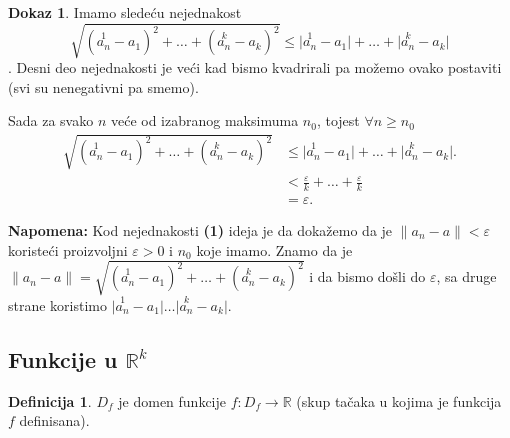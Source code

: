 \documentclass[11pt]{article}
\theoremstyle{definition}
\newtheorem{definicija}{Definicija}[section]
\theoremstyle{serbnodot}
\newtheorem*{dokaz}{Dokaz}
\newcommand{\napomena}[1]{%
    \textbf{Napomena:} #1
}
\begin{document}
\begin{dokaz}
    \vspace{1em}
    Imamo sledeću nejednakost
    \[
        \sqrt{(\overset{1}{a_n} - a_1)^2 + \dots +
        (\overset{k}{a_n} - a_k)^2}
        \leq
        \lvert \overset{1}{a_n} - a_1 \rvert + \dots +
        \lvert \overset{k}{a_n} - a_k \rvert \tag{1}
    \].
    Desni deo nejednakosti je veći kad bismo kvadrirali pa možemo
    ovako postaviti (svi su nenegativni pa smemo).

    Sada za svako \(n\) veće od izabranog maksimuma \(n_0\), tojest
    \(\forall n \geq n_0\)
    \begin{align*}
        \sqrt{(\overset{1}{a_n} - a_1)^2 + \dots +
        (\overset{k}{a_n} - a_k)^2}
        &\leq
        \lvert \overset{1}{a_n} - a_1 \rvert + \dots +
        \lvert \overset{k}{a_n} - a_k \rvert. \\
        &< \frac{\varepsilon}{k} + \dots + \frac{\varepsilon}{k} \\
        &= \varepsilon.
    \end{align*}
\end{dokaz}

\napomena{ Kod nejednakosti \textbf{(1)} ideja je da dokažemo da je 
    \(\lVert a_n - a \rVert < \varepsilon\) koristeći proizvoljni 
    \(\varepsilon > 0\) i \(n_0\) koje imamo. Znamo da je \(\lVert a_n - a \rVert =
    \sqrt{(\overset{1}{a_n} - a_1)^2 + \dots +
        (\overset{k}{a_n} - a_k)^2} \) i da bismo došli do  \(\varepsilon\), sa druge
        strane koristimo  
        \(\lvert \overset{1}{a_n} - a_1 \rvert 
        \dots \lvert \overset{k}{a_n} - a_k \rvert.\) 
    }

\subsection{Funkcije u \(\mathbb{R}^k\)}

\begin{definicija}
    \(D_f\) je domen funkcije \(f: D_f \to \mathbb{R}\) (skup tačaka u kojima je 
    funkcija \(f\) definisana).
\end{definicija}
\end{document}
